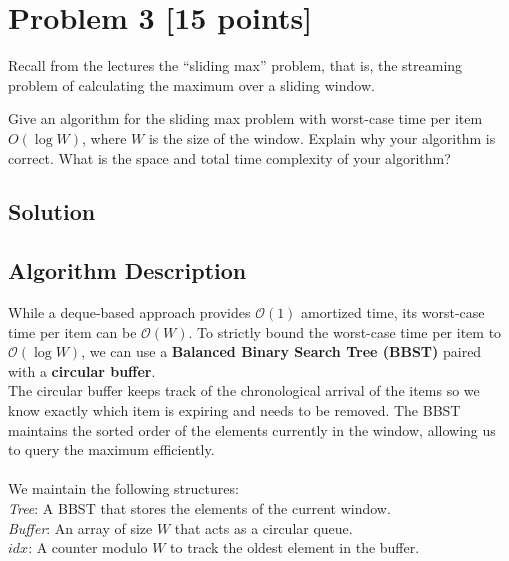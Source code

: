 \documentclass[11pt]{article}
\begin{document}
\section*{Problem 3 [15 points]}

Recall from the lectures the ``sliding max'' problem, that is, the streaming problem of calculating the maximum over a sliding window.

Give an algorithm for the sliding max problem with worst-case time per item $O(\log W)$, where $W$ is the size of the window. Explain why your algorithm is correct. What is the space and total time complexity of your algorithm?

\subsection*{Solution}

\subsection*{Algorithm Description}

While a deque-based approach provides $\mathcal{O}(1)$ amortized time, its worst-case time per item can be $\mathcal{O}(W)$. To strictly bound the worst-case time per item to $\mathcal{O}(\log W)$, we can use a \textbf{Balanced Binary Search Tree (BBST)} paired with a \textbf{circular buffer}.\\
The circular buffer keeps track of the chronological arrival of the items so we know exactly which item is expiring and needs to be removed. The BBST maintains the sorted order of the elements currently in the window, allowing us to query the maximum efficiently.\\ \\ 
We maintain the following structures:\\
\textit{Tree}: A BBST that stores the elements of the current window.\\
\textit{Buffer}: An array of size $W$ that acts as a circular queue.\\
$\textit{idx}$: A counter modulo $W$ to track the oldest element in the buffer.\\
\end{document}
